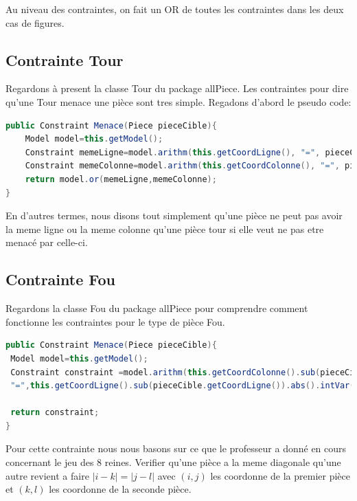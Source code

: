 \documentclass[a4paper,10pt]{article}
\begin{document}
\par Au niveau des contraintes, on fait un OR de toutes les contraintes dans les deux cas de figures.

\subsection{Contrainte Tour}
\par Regardons à present la classe Tour du package allPiece. Les contraintes pour dire qu'une Tour menace une pièce sont tres simple. Regadons d'abord le pseudo code:

\begin{lstlisting}[language=Java,basicstyle=\tiny]
public Constraint Menace(Piece pieceCible){
	Model model=this.getModel();
	Constraint memeLigne=model.arithm(this.getCoordLigne(), "=", pieceCible.getCoordLigne());
	Constraint memeColonne=model.arithm(this.getCoordColonne(), "=", pieceCible.getCoordColonne());
	return model.or(memeLigne,memeColonne);
}
\end{lstlisting}
 En d'autres termes, nous disons tout simplement qu'une pièce ne peut pas avoir la meme ligne ou la meme colonne qu'une pièce tour si elle veut ne pas etre menacé par celle-ci.
\subsection{Contrainte Fou}
\par Regardons la classe Fou du package allPiece pour comprendre comment fonctionne les contraintes pour le type de pièce Fou.
\begin{lstlisting}[language=Java,basicstyle=\tiny]
public Constraint Menace(Piece pieceCible){
 Model model=this.getModel();
 Constraint constraint =model.arithm(this.getCoordColonne().sub(pieceCible.getCoordColonne()).abs().intVar(),
 "=",this.getCoordLigne().sub(pieceCible.getCoordLigne()).abs().intVar());
	   
 return constraint;
}
\end{lstlisting}

Pour cette contrainte nous nous basons sur ce que le professeur a donné en cours concernant le jeu des 8 reines. Verifier qu'une pièce a la meme diagonale qu'une autre revient a faire $|i-k|=|j-l|$ avec $(i,j)$ les coordonne de la premier pièce et $(k,l)$ les coordonne de la seconde pièce.
\end{document}
